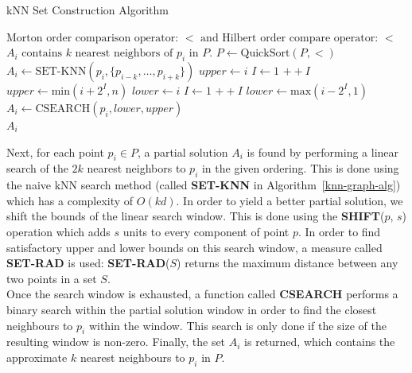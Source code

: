 \documentclass[10pt]{article}
\begin{document}
\begin{algorithm}[H]
  \caption{kNN Set Construction Algorithm}
  \label{knn-graph-alg}
  \begin{algorithmic}[1]
    \Require $\text{Morton order comparison operator: } < 
    \text{ and Hilbert order compare operator: } <$
    \Ensure $A_i \text{ contains } k \text{ nearest neighbors of } p_i \text{ in } P \text{.}$
    \State $P \leftarrow \text{QuickSort}(P, <)$
    \State $A_i \leftarrow \text{SET-KNN}(p_i, \{p_{i-k}, \dots, p_{i+k} \})$
    \State $upper \leftarrow i$
    \Else
    \State $I \leftarrow 1$
    \State $++I$
    \EndWhile
    \State $upper \leftarrow \text{min}(i+2^I, n)$
    \EndIf
    \State $lower \leftarrow i$
    \Else
    \State $I \leftarrow 1$
    \State $++I$
    \EndWhile
    \State $lower \leftarrow \text{max}(i-2^I, 1)$
    \EndIf
    \State $A_i \leftarrow \text{CSEARCH}(p_i, lower, upper)$
    \EndIf
    \EndFor \\
    \Return $A_i$
  \end{algorithmic}
\end{algorithm}

Next, for each point $p_i \in P$, a partial solution $A_i$ is found by performing a linear search of the $2k$ nearest neighbors to $p_i$ in the given ordering. This is done using the naive kNN search method (called {\bf SET-KNN} in Algorithm~\ref{knn-graph-alg}) which has a complexity of $O(kd)$. In order to yield a better partial solution, we shift the bounds of the linear search window. This is done using the {\bf SHIFT}($p$, $s$) operation which adds $s$ units to every component of point $p$. In order to find satisfactory upper and lower bounds on this search window, a measure called {\bf SET-RAD} is used: {\bf SET-RAD}($S$) returns the maximum distance between any two points in a set $S$. \\[10pt]

Once the search window is exhausted, a function called {\bf CSEARCH} performs a binary search within the partial solution window in order to find the closest neighbours to $p_i$ within the window. This search is only done if the size of the resulting window is non-zero. Finally, the set $A_i$ is returned, which contains the approximate $k$ nearest neighbours to $p_i$ in $P$. \\[10pt]
\end{document}
